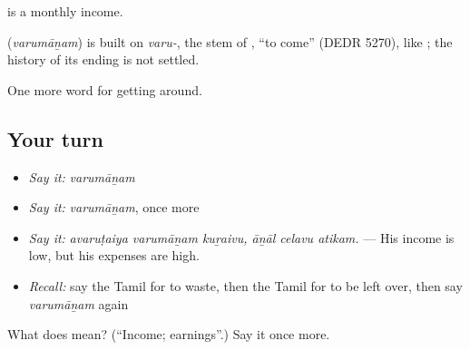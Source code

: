   is a monthly income.

\begin{cousinweb}
\textbf{} (\emph{varumāṉam}) is built on \emph{varu-}, the stem of , \textquotedblleft{}to come\textquotedblright{} (DEDR 5270), like ; the history of its ending is not settled.
\end{cousinweb}

\begin{grammarlens}[title={What you've built}]
One more word for getting around.
\end{grammarlens}

\subsection*{Your turn}
\begin{itemize}
\raggedright
  \item \emph{Say it:} \emph{varumāṉam}
  \item \emph{Say it:} \emph{varumāṉam}, once more
  \item \emph{Say it:} \emph{avaruṭaiya varumāṉam kuṟaivu, āṉāl celavu atikam.} — His income is low, but his expenses are high.
  \item \emph{Recall:} say the Tamil for to waste, then the Tamil for to be left over, then say \emph{varumāṉam} again
\end{itemize}

\begin{tcolorbox}[breakable,colback=teal!4,colframe=teal!35!black,title={Before you move on}]
What does  mean? (\textquotedblleft{}Income; earnings\textquotedblright{}.) Say it once more.
\end{tcolorbox}
